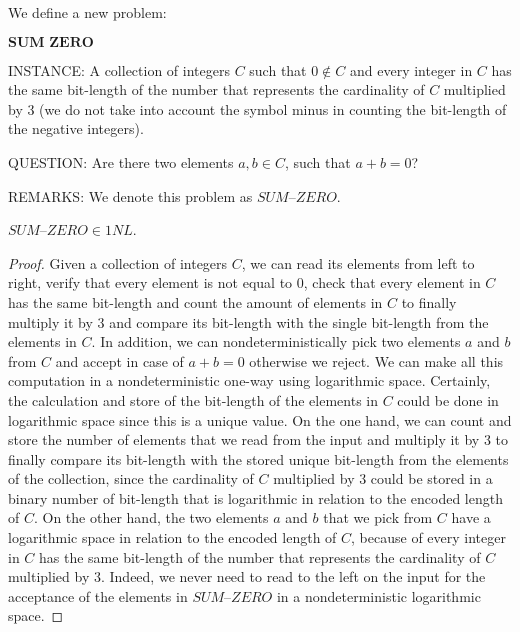 \documentclass[a4paper,UKenglish,cleveref, autoref]{lipics-v2019}
\begin{document}
We define a new problem:

\begin{definition}
$\textbf{SUM ZERO}$

INSTANCE: A collection of integers $C$ such that $0 \notin C$ and every integer in $C$ has the same bit-length of the number that represents the cardinality of $C$ multiplied by $3$ (we do not take into account the symbol minus in counting the bit-length of the negative integers).

QUESTION: Are there two elements $a, b \in C$, such that $a + b = 0$?

REMARKS: We denote this problem as $\textit{SUM--ZERO}$.
\end{definition}


\begin{theorem}
\label{1nl}
$\textit{SUM--ZERO} \in 1NL$.
\end{theorem}

\begin{proof}
Given a collection of integers $C$, we can read its elements from left to right, verify that every element is not equal to $0$, check that every element in $C$ has the same bit-length and count the amount of elements in $C$ to finally multiply it by $3$ and compare its bit-length with the single bit-length from the elements in $C$. In addition, we can nondeterministically pick two elements $a$ and $b$ from $C$ and accept in case of $a + b = 0$ otherwise we reject. We can make all this computation in a nondeterministic one-way using logarithmic space. Certainly, the calculation and store of the bit-length of the elements in $C$ could be done in logarithmic space since this is a unique value. On the one hand, we can count and store the number of elements that we read from the input and multiply it by $3$ to finally compare its bit-length with the stored unique bit-length from the elements of the collection, since the cardinality of $C$ multiplied by $3$ could be stored in a binary number of bit-length that is logarithmic in relation to the encoded length of $C$. On the other hand, the two elements $a$ and $b$ that we pick from $C$ have a logarithmic space in relation to the encoded length of $C$, because of every integer in $C$ has the same bit-length of the number that represents the cardinality of $C$ multiplied by $3$. Indeed, we never need to read to the left on the input for the acceptance of the elements in $\textit{SUM--ZERO}$ in a nondeterministic logarithmic space.
\end{proof}
\end{document}
